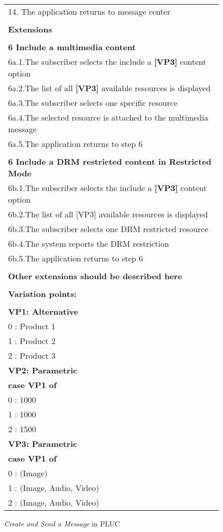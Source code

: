 \documentclass{acm_proc_article-sp}
\begin{document}
\begin{figure}[t]
\begin{center}
\begin{tiny}
{{\begin{tabular}{l}
14. The application returns to message center \\ \\
{\bf Extensions} \\ \\
{\bf 6 Include a multimedia content} \\
6a.1.The subscriber selects the include a {\bf [VP3]} content option \\
6a.2.The list of all {\bf [VP3]} available resources is displayed \\
6a.3.The subscriber selects one specific resource \\
6a.4.The selected resource is attached to the multimedia message \\
6a.5.The application returns to step 6 \\ \\
{\bf 6 Include a DRM restricted content in Restricted Mode} \\
6b.1.The subscriber selects the include a {\bf [VP3]} content option \\
6b.2.The list of all [VP3] available resources is displayed \\
6b.3.The subscriber selects one DRM restricted resource \\
6b.4.The system reports the DRM restriction \\
6b.5.The application returns to step 6 \\ \\
{\bf Other extensions should be described here} \\ \\
{\bf Variation points: } \\ \\
   {\bf VP1: Alternative} \\
      0 : Product 1 \\
      1 : Product 2 \\
      2 : Product 3 \\
   {\bf VP2: Parametric} \\
      {\bf case VP1 of} \\
       0 : 1000 \\
       1 : 1000 \\
       2 : 1500 \\
   {\bf VP3: Parametric} \\
      {\bf case VP1 of} \\
       0 : (Image) \\
       1 : (Image, Audio, Video) \\
       2 : (Image, Audio, Video) \\    
   \end{tabular}
  } }
\end{tiny}
\end{center}
\caption{\emph{Create and Send a Message} in PLUC}
\label{fig:pluc-01}

\end{figure}
\end{document}
